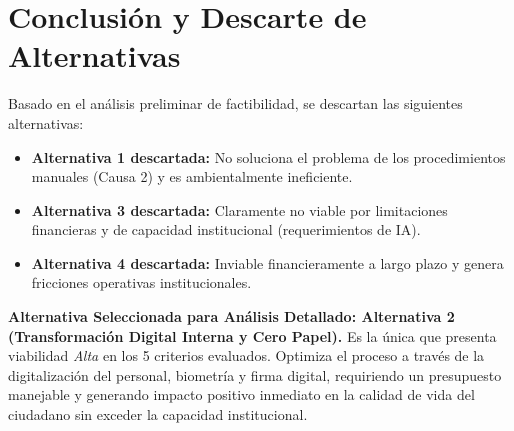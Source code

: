 \section{Conclusión y Descarte de Alternativas}

Basado en el análisis preliminar de factibilidad, se descartan las siguientes alternativas:

\begin{itemize}
    \item \textbf{Alternativa 1 descartada:} No soluciona el problema de los procedimientos manuales (Causa 2) y es ambientalmente ineficiente.
    \item \textbf{Alternativa 3 descartada:} Claramente no viable por limitaciones financieras y de capacidad institucional (requerimientos de IA).
    \item \textbf{Alternativa 4 descartada:} Inviable financieramente a largo plazo y genera fricciones operativas institucionales.
\end{itemize}

\textbf{Alternativa Seleccionada para Análisis Detallado: Alternativa 2 (Transformación Digital Interna y Cero Papel).} Es la única que presenta viabilidad \textit{Alta} en los 5 criterios evaluados. Optimiza el proceso a través de la digitalización del personal, biometría y firma digital, requiriendo un presupuesto manejable y generando impacto positivo inmediato en la calidad de vida del ciudadano sin exceder la capacidad institucional.